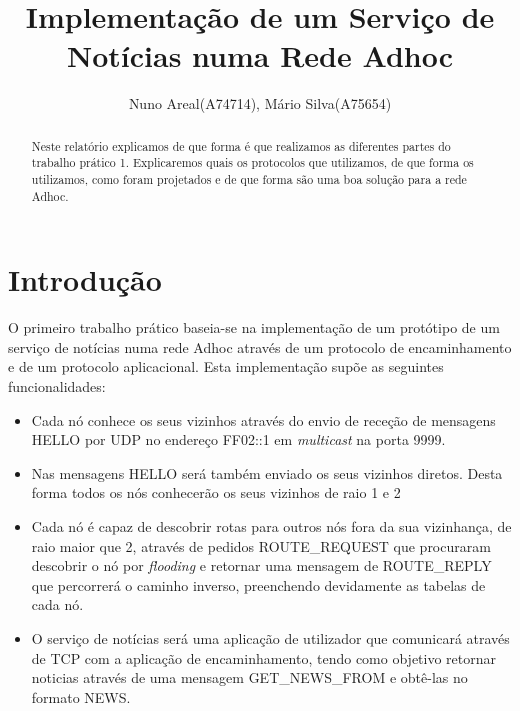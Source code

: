 \documentclass{llncs}
\begin{document}
%
\frontmatter          %
%
\pagestyle{headings}  %
%

%
\title{Implementação de um Serviço de Notícias numa Rede Adhoc}
%
%
\author{Nuno Areal(A74714), Mário Silva(A75654)}
%
%
%

\maketitle              %

\begin{abstract}
Neste relatório explicamos de que forma é que realizamos as diferentes partes do trabalho prático 1.
Explicaremos quais os protocolos que utilizamos, de que forma os utilizamos, como foram projetados e de que forma são uma boa solução para a rede Adhoc.
\end{abstract}
%
\section{Introdução}
%
O primeiro trabalho prático baseia-se na implementação de um protótipo de um serviço de notícias numa rede Adhoc através de um protocolo de encaminhamento e de um protocolo aplicacional. Esta implementação supõe as seguintes funcionalidades:

\begin{itemize}
    \item Cada nó conhece os seus vizinhos através do envio de receção de mensagens HELLO por UDP no endereço FF02::1 em \emph{multicast} na porta 9999.
    \item Nas mensagens HELLO será também enviado os seus vizinhos diretos. Desta forma todos os nós conhecerão os seus vizinhos de raio 1 e 2
    \item Cada nó é capaz de descobrir rotas para outros nós fora da sua vizinhança, de raio maior que 2, através de pedidos ROUTE\_REQUEST que procuraram descobrir o nó por \emph{flooding} e retornar uma mensagem de ROUTE\_REPLY que percorrerá o caminho inverso, preenchendo devidamente as tabelas de cada nó.
    \item O serviço de notícias será uma aplicação de utilizador que comunicará através de TCP com a aplicação de encaminhamento, tendo como objetivo retornar noticias através de uma mensagem  GET\_NEWS\_FROM e obtê-las no formato NEWS.
\end{itemize}
\end{document}

